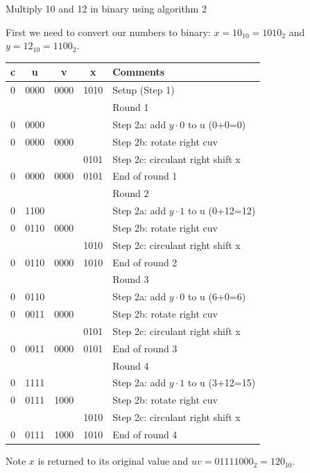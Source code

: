 \begin{example}
Multiply 10 and 12 in binary using algorithm 2

{\color{ans}
First we need to convert our numbers to binary: $x=10_{10} = 1010_2$ and $y=12_{10} = 1100_2$.

\begin{tabular}{ccccp{2in}}
c & u    & v    & x    & Comments  \\\hline
0 & 0000 & 0000 & 1010 & Setup (Step 1) \\\hline
  &      &      &      & Round 1\\
0 & 0000 &      &      & Step 2a: add $y\cdot 0$ to u (0+0=0)\\
0 & 0000 & 0000 &      & Step 2b: rotate right cuv \\
  &      &      & 0101 & Step 2c: circulant right shift x \\
0 & 0000 & 0000 & 0101 & End of round 1 \\\hline
  &      &      &      & Round 2\\
0 & 1100 &      &      & Step 2a: add $y\cdot 1$ to u (0+12=12)\\
0 & 0110 & 0000 &      & Step 2b: rotate right cuv \\
  &      &      & 1010 & Step 2c: circulant right shift x \\
0 & 0110 & 0000 & 1010 & End of round 2 \\\hline
  &      &      &      & Round 3\\
0 & 0110 &      &      & Step 2a: add $y\cdot 0$ to u (6+0=6)\\
0 & 0011 & 0000 &      & Step 2b: rotate right cuv \\
  &      &      & 0101 & Step 2c: circulant right shift x \\
0 & 0011 & 0000 & 0101 & End of round 3 \\\hline
  &      &      &      & Round 4\\
0 & 1111 &      &      & Step 2a: add $y\cdot 1$ to u (3+12=15)\\
0 & 0111 & 1000 &      & Step 2b: rotate right cuv \\
  &      &      & 1010 & Step 2c: circulant right shift x \\
0 & 0111 & 1000 & 1010 & End of round 4 \\\hline
\end{tabular}

Note $x$ is returned to its original value and $uv = 01111000_2 = 120_{10}$.
}
\end{example}

